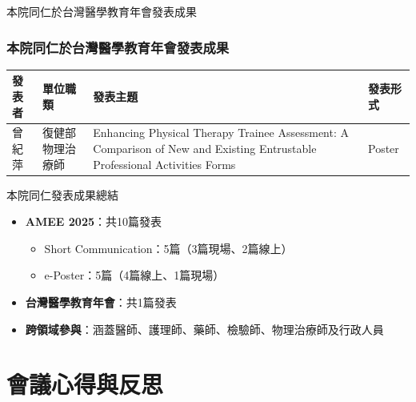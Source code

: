 \documentclass[aspectratio=169]{beamer}
\newcommand{\tablesize}{\fontsize{7.5pt}{9pt}\selectfont}
\begin{document}
\begin{frame}{本院同仁於台灣醫學教育年會發表成果}
\frametitle{本院同仁於台灣醫學教育年會發表成果}

\begin{table}[h]
\centering
\tablesize
\begin{tabular}{p{1.5cm}p{2.5cm}p{6cm}p{1.5cm}}
\toprule
\textbf{發表者} & \textbf{單位職類} & \textbf{發表主題} & \textbf{發表形式} \\
\midrule
曾紀萍 & 復健部物理治療師 & Enhancing Physical Therapy Trainee Assessment: A Comparison of New and Existing Entrustable Professional Activities Forms & Poster \\
\bottomrule
\end{tabular}
\end{table}

\vspace{0.5cm}

\begin{block}{本院同仁發表成果總結}
\begin{itemize}
    \item \textbf{AMEE 2025}：共10篇發表
    \begin{itemize}
        \item Short Communication：5篇（3篇現場、2篇線上）
        \item e-Poster：5篇（4篇線上、1篇現場）
    \end{itemize}
    \item \textbf{台灣醫學教育年會}：共1篇發表
    \item \textbf{跨領域參與}：涵蓋醫師、護理師、藥師、檢驗師、物理治療師及行政人員
\end{itemize}
\end{block}
\end{frame}

\section{會議心得與反思}
\end{document}
